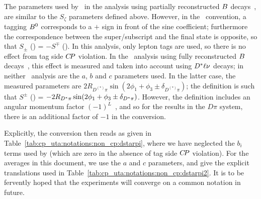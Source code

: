The parameters used by \belle\ in the analysis using 
partially reconstructed $B$ decays~\cite{Bahinipati:2011yq}, 
are similar to the $S_\zeta$ parameters defined above. 
However, in the \belle\ convention, 
a tagging $B^0$ corresponds to a $+$ sign in front of the sine coefficient; 
furthermore the correspondence between the super/subscript 
and the final state is opposite, so that $S_\pm$ (\babar) = $- S^\mp$ (\belle). 
In this analysis, only lepton tags are used, 
so there is no effect from tag side $C\!P$ violation. 
In the \belle\ analysis using 
fully reconstructed $B$ decays~\cite{Ronga:2006hv}, 
this effect is measured and taken into account using $D^* \ell \nu$ decays; 
in neither \belle\ analysis are the $a$, $b$ and $c$ parameters used. 
In the latter case, the measured parameters are 
$2 R_{D^{(*)}\pi} \sin( 2\phi_1 + \phi_3 \pm \delta_{D^{(*)}\pi} )$; 
the definition is such that 
$S^\pm$ (\belle) = $- 2 R_{D^* \pi} \sin( 2\phi_1 + \phi_3 \pm \delta_{D^* \pi} )$. 
However, the definition includes an 
angular momentum factor $(-1)^L$~\cite{Fleischer:2003yb}, 
and so for the results in the $D\pi$ system, 
there is an additional factor of $-1$ in the conversion.

Explicitly, the conversion then reads as given in 
Table~\ref{tab:cp_uta:notations:non_cp:dstarpi}, 
where we have neglected the $b_i$ terms used by \babar
(which are zero in the absence of tag side $C\!P$ violation).
For the averages in this document,
we use the $a$ and $c$ parameters,
and give the explicit translations used in 
Table~\ref{tab:cp_uta:notations:non_cp:dstarpi2}.
It is to be fervently hoped that the experiments will
converge on a common notation in future.

